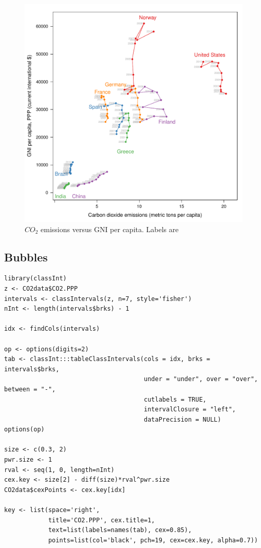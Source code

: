 \begin{figure}[htb]
\centering
\includegraphics[width=.9\linewidth]{figs/CO2_capitaDL.pdf}
\caption{$CO_2$ emissions versus GNI per capita. Labels are}
\end{figure}
\subsection{Bubbles}
\label{sec-1-4}



\lstset{language=R}
\begin{lstlisting}
library(classInt)
z <- CO2data$CO2.PPP
intervals <- classIntervals(z, n=7, style='fisher')
nInt <- length(intervals$brks) - 1

idx <- findCols(intervals)

op <- options(digits=2)
tab <- classInt:::tableClassIntervals(cols = idx, brks = intervals$brks,
                                      under = "under", over = "over", between = "-", 
                                      cutlabels = TRUE,
                                      intervalClosure = "left",
                                      dataPrecision = NULL)
options(op)

size <- c(0.3, 2)
pwr.size <- 1
rval <- seq(1, 0, length=nInt)
cex.key <- size[2] - diff(size)*rval^pwr.size 
CO2data$cexPoints <- cex.key[idx]

key <- list(space='right',
            title='CO2.PPP', cex.title=1,
            text=list(labels=names(tab), cex=0.85),
            points=list(col='black', pch=19, cex=cex.key, alpha=0.7))
\end{lstlisting}


